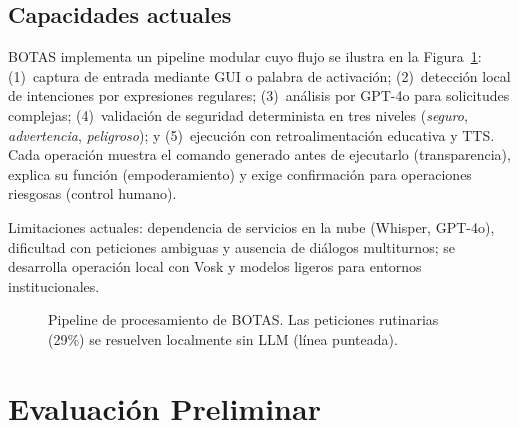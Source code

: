 \documentclass[12pt]{article}
\begin{document}
\subsection{Capacidades actuales}
\label{subsec:capabilities}

\noindent
BOTAS implementa un pipeline modular cuyo flujo se ilustra en la
Figura~\ref{fig:pipeline}: (1)~captura de entrada mediante GUI o palabra
de activación; (2)~detección local de intenciones por expresiones regulares;
(3)~análisis por GPT-4o para solicitudes complejas; (4)~validación de seguridad
determinista en tres niveles (\textit{seguro}, \textit{advertencia},
\textit{peligroso}); y (5)~ejecución con retroalimentación educativa y TTS.
Cada operación muestra el comando generado antes de ejecutarlo
(transparencia), explica su función (empoderamiento) y exige confirmación
para operaciones riesgosas (control humano).

Limitaciones actuales: dependencia de servicios en la nube (Whisper, GPT-4o),
dificultad con peticiones ambiguas y ausencia de diálogos multiturnos; se
desarrolla operación local con Vosk y modelos ligeros para entornos institucionales.

\begin{figure}[h]
\centering
{}
\caption{Pipeline de procesamiento de BOTAS. Las peticiones rutinarias
(29\%) se resuelven localmente sin LLM (línea punteada).}
\label{fig:pipeline}
\end{figure}


\section{Evaluación Preliminar}
\label{sec:evaluation}
\end{document}
